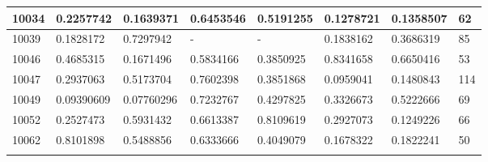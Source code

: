 \begin{anexosenv}
\begin{table}[H]
{\begin{tabular}{|l|l|l|l|l|l|l|l|}
						10034 & 0.2257742 & 0.1639371 & 0.6453546 & 0.5191255 & 0.1278721 & 0.1358507 & 62 \\ \hline
						10039 & 0.1828172 & 0.7297942 & - & - & 0.1838162 & 0.3686319 & 85 \\ \hline
						10046 & 0.4685315 & 0.1671496 & 0.5834166 & 0.3850925 & 0.8341658 & 0.6650416 & 53 \\ \hline
						10047 & 0.2937063 & 0.5173704 & 0.7602398 & 0.3851868 & 0.0959041 & 0.1480843 & 114 \\ \hline
						10049 & 0.09390609 & 0.07760296 & 0.7232767 & 0.4297825 & 0.3326673 & 0.5222666 & 69 \\ \hline
						10052 & 0.2527473 & 0.5931432 & 0.6613387 & 0.8109619 & 0.2927073 & 0.1249226 & 66 \\ \hline
						10062 & 0.8101898 & 0.5488856 & 0.6333666 & 0.4049079 & 0.1678322 & 0.1822241 & 50 \\ \hline      
\label{tab:nosocssemrotacaoII}
\end{tabular}
}
\end{table}


\end{anexosenv}

